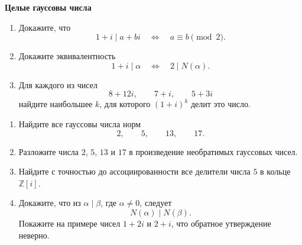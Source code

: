 
\centerline{\bf \Huge Целые гауссовы числа}

\begin{flushright}
        \scriptsize{}
\end{flushright}


\begin{enumerate}[label=\textbf{\alph*)}, leftmargin=8mm]
    \item Докажите, что
    \[
        1+i\mid a+bi
        \quad\Longleftrightarrow\quad
        a\equiv b\pmod 2.
    \]

    \item Докажите эквивалентность
    \[
        1+i\mid\alpha
        \quad\Longleftrightarrow\quad
        2\mid N(\alpha).
    \]

    \item Для каждого из чисел
    \[
        8+12i,\qquad 7+i,\qquad 5+3i
    \]
    найдите наибольшее $k$, для которого $(1+i)^k$ делит это число.
\end{enumerate}

\medskip


\begin{enumerate}[label=\textbf{\alph*)}, leftmargin=8mm]
    \item Найдите все гауссовы числа норм
    \[
        2,\qquad 5,\qquad 13,\qquad 17.
    \]

    \item Разложите числа $2$, $5$, $13$ и $17$ в произведение
    необратимых гауссовых чисел.

    \item Найдите с точностью до ассоциированности все делители числа
    $5$ в кольце $\mathbb Z[i]$.

    \item Докажите, что из $\alpha\mid\beta$, где $\alpha\ne0$, следует
    \[
        N(\alpha)\mid N(\beta).
    \]
    Покажите на примере чисел $1+2i$ и $2+i$, что обратное утверждение
    неверно.
\end{enumerate}

